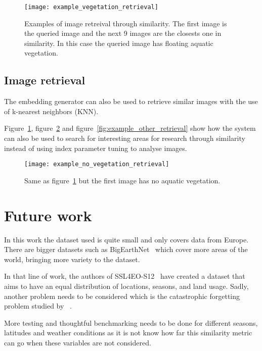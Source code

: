 \documentclass[conference]{IEEEtran}
\begin{document}
    \begin{figure}[t]
        \centering
        \texttt{[image: example\_vegetation\_retrieval]}
        \caption{Examples of image retreival through similarity. The first image is the queried image and the next 9 images are the closests one in similarity.
        In this case the queried image has floating aquatic vegetation.}
        \label{fig:example_vegetation_retrieval}
    \end{figure}

    \subsection{Image retrieval}
    The embedding generator can also be used to retrieve similar images with the use of k-nearest neighbors (KNN).

    Figure~\ref{fig:example_vegetation_retrieval}, figure~\ref{fig:example_no_vegetation_retrieval} and figure~\ref{fig:example_other_retrieval} show how the system can also
    be used to search for interesting areas for research through similarity instead of using index parameter tuning to analyse images.



    \begin{figure}[t]
        \centering
        \texttt{[image: example\_no\_vegetation\_retrieval]}
        \caption{Same as figure~\ref{fig:example_vegetation_retrieval} but the first image has no aquatic vegetation.}
        \label{fig:example_no_vegetation_retrieval}
    \end{figure}


    \section{Future work}
    In this work the dataset used is quite small and only covers data from Europe.
    There are bigger datasets such as BigEarthNet~\cite{bigearthnet} which cover more areas of the world, bringing more variety to the dataset.

    In that line of work, the authors of SSL4EO-S12~\cite{wang2023ssl4eos12} have created a dataset that aims to have an equal distribution of locations, seasons, and land usage.
    Sadly, another problem needs to be considered which is the catastrophic forgetting problem studied by ~\citet{kirkpatrick2017overcoming, de2021continual, 10135093, purushwalkam2022challenges}.

    More testing and thoughtful benchmarking needs to be done for different seasons, latitudes and weather conditions as it is not know
    how far this similarity metric can go when these variables are not considered.
\end{document}
